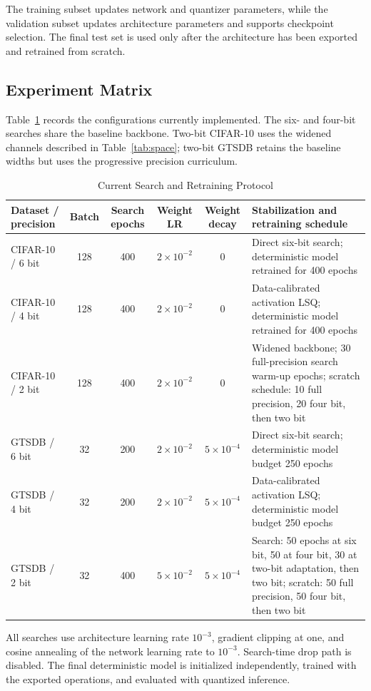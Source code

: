 \documentclass[lettersize,journal]{IEEEtran}
\begin{document}
The training subset updates network and quantizer parameters, while the validation subset updates architecture parameters and supports checkpoint selection. The final test set is used only after the architecture has been exported and retrained from scratch.

\subsection{Experiment Matrix}
Table~\ref{tab:protocol} records the configurations currently implemented. The six- and four-bit searches share the baseline backbone. Two-bit CIFAR-10 uses the widened channels described in Table~\ref{tab:space}; two-bit GTSDB retains the baseline widths but uses the progressive precision curriculum.

\begin{table}[!t]
\caption{Current Search and Retraining Protocol}
\label{tab:protocol}
\centering
\renewcommand{\arraystretch}{1.13}
\begin{tabular}{|l|c|c|c|c|p{}|}
\hline
Dataset / precision & Batch & Search epochs & Weight LR & Weight decay & Stabilization and retraining schedule\\
\hline
CIFAR-10 / 6 bit & 128 & 400 & $2\times10^{-2}$ & 0 & Direct six-bit search; deterministic model retrained for 400 epochs\\
CIFAR-10 / 4 bit & 128 & 400 & $2\times10^{-2}$ & 0 & Data-calibrated activation LSQ; deterministic model retrained for 400 epochs\\
CIFAR-10 / 2 bit & 128 & 400 & $2\times10^{-2}$ & 0 & Widened backbone; 30 full-precision search warm-up epochs; scratch schedule: 10 full precision, 20 four bit, then two bit\\
GTSDB / 6 bit & 32 & 200 & $2\times10^{-2}$ & $5\times10^{-4}$ & Direct six-bit search; deterministic model budget 250 epochs\\
GTSDB / 4 bit & 32 & 200 & $2\times10^{-2}$ & $5\times10^{-4}$ & Data-calibrated activation LSQ; deterministic model budget 250 epochs\\
GTSDB / 2 bit & 32 & 400 & $5\times10^{-2}$ & $5\times10^{-4}$ & Search: 50 epochs at six bit, 50 at four bit, 30 at two-bit adaptation, then two bit; scratch: 50 full precision, 50 four bit, then two bit\\
\hline
\end{tabular}
\end{table}

All searches use architecture learning rate $10^{-3}$, gradient clipping at one, and cosine annealing of the network learning rate to $10^{-3}$. Search-time drop path is disabled. The final deterministic model is initialized independently, trained with the exported operations, and evaluated with quantized inference.
\end{document}
